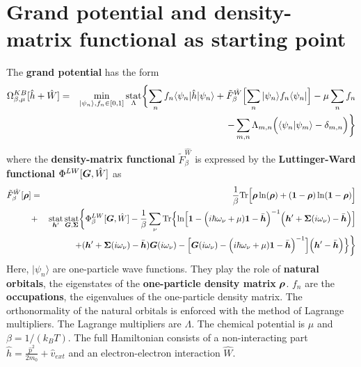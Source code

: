 \documentclass[11pt,a4paper]{report}
\begin{document}
\section{Grand potential and density-matrix 
functional as starting point}
The \textbf{grand potential}
 has the form\cite{bloechl13_prb88_25139}
\begin{eqnarray}
\Omega^{KB}_{\beta,\mu}[\hat{h}+\hat{W}]
&=&\min_{|\psi_n\rangle,f_n\in[0,1]}\operatorname*{stat}_\Lambda
\biggl\lbrace\sum_n f_n\langle\psi_n|\hat{h}|\psi_n\rangle
+\tilde{F}_\beta^{\hat{W}}\Bigl[\sum_n|\psi_n\rangle f_n\langle\psi_n|\Bigr]
-\mu\sum_n f_n\nonumber\\
&&
-\sum_{m,n}\Lambda_{m,n}\Bigl(\langle\psi_n|\psi_m\rangle-\delta_{m,n}\Bigr)
\biggr\rbrace
\label{eq:gcpdm2}
\end{eqnarray}
where the \textbf{density-matrix functional} $\tilde{F}_\beta^{\hat{W}}$ is
expressed\cite{bloechl13_prb88_25139} by the \textbf{Luttinger-Ward
  functional}
\cite{luttinger60_pr118_1417} $\Phi^{LW}[\bm{G},\hat{W}]$ as
\begin{eqnarray}
\tilde{F}^{\hat{W}}_\beta[\bm{\rho}]
&=&
\frac{1}{\beta}\mathrm{Tr}\Bigl[
\bm{\rho}\ln(\bm{\rho})+(\bm{1}-\bm{\rho})\ln(\bm{1}-\bm{\rho})\Bigr]
\nonumber\\
&+&
\operatorname*{stat}_{\bm{h}'}\operatorname*{stat}_{\bm{G},\bm{\Sigma}}
\biggl\lbrace
\Phi^{LW}_\beta[\bm{G},\hat{W}]
-\frac{1}{\beta}\sum_\nu\mathrm{Tr}\Bigl\lbrace
\ln\Bigl[
\bm{1}-
\Bigl(i\hbar\omega_\nu+\mu)\bm{1}-\bar{\bm{h}}\Bigr)^{-1}
\Bigl(\bm{h}'+\bm{\Sigma}(i\omega_\nu)-\bar{\bm{h}}\Bigr)
\Bigr]
\nonumber\\&&
+(\bm{h}'+\bm{\Sigma}(i\omega_\nu)-\bar{\bm{h}})\bm{G}(i\omega_\nu)
-
\Bigl[
\bm{G}(i\omega_\nu)
-\Bigl(i\hbar\omega_\nu+\mu)\bm{1}-\bar{\bm{h}}\Bigr)^{-1}
\Bigr]
\Bigl(\bm{h}'-\bar{\bm{h}}\Bigr)\Bigr\rbrace
\biggr\rbrace
\label{eq:dmfgreen}
\end{eqnarray}
Here, $|\psi_n\rangle$ are one-particle wave functions. They play the
role of \textbf{natural orbitals}, the
eigenstates of the \textbf{one-particle density
  matrix}
$\bm{\rho}$. $f_n$ are the \textbf{occupations},
the eigenvalues of the one-particle density matrix. The orthonormality
of the natural orbitals is enforced with the method of Lagrange
multipliers. The Lagrange multipliers are $\Lambda$. The chemical
potential is $\mu$ and $\beta=1/(k_BT)$. The full Hamiltonian consists
of a non-interacting part
$\hat{h}=\frac{\hat{p}^2}{2m_0}+\hat{v}_{ext}$ and an
electron-electron interaction $\hat{W}$.
\end{document}
